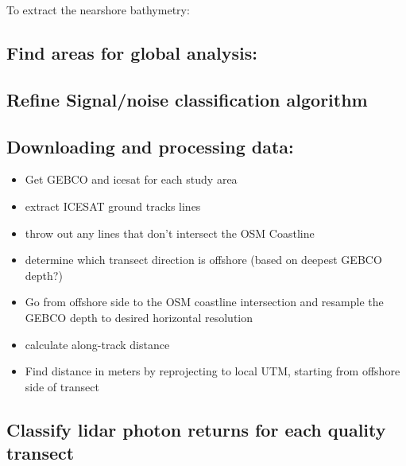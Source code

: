 To extract the nearshore bathymetry:

\hypertarget{find-areas-for-global-analysis}{%
  \subsection{Find areas for global
    analysis:}\label{find-areas-for-global-analysis}}

\hypertarget{refine-signalnoise-classification-algorithm}{%
  \subsection{Refine Signal/noise classification
    algorithm}\label{refine-signalnoise-classification-algorithm}}

\hypertarget{downloading-and-processing-data}{%
  \subsection{Downloading and processing
    data:}\label{downloading-and-processing-data}}

\begin{itemize}

  \item
        Get GEBCO and icesat for each study area
  \item
        extract ICESAT ground tracks lines
  \item
        throw out any lines that don't intersect the OSM Coastline
  \item
        determine which transect direction is offshore (based on deepest GEBCO
        depth?)
  \item
        Go from offshore side to the OSM coastline intersection and resample
        the GEBCO depth to desired horizontal resolution
  \item
        calculate along-track distance
  \item
        Find distance in meters by reprojecting to local UTM, starting from
        offshore side of transect
\end{itemize}

\hypertarget{classify-lidar-photon-returns-for-each-quality-transect}{%
  \subsection{Classify lidar photon returns for each quality
    transect}\label{classify-lidar-photon-returns-for-each-quality-transect}}

